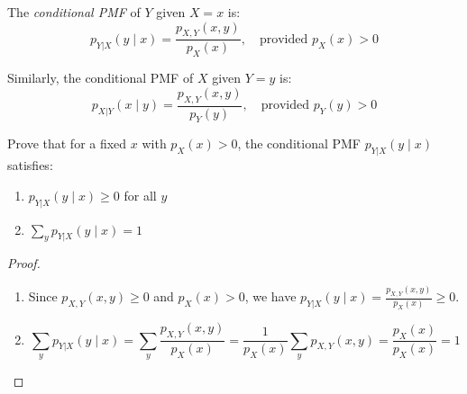 \begin{definition}
The \emph{conditional PMF} of $Y$ given $X = x$ is:
\[
p_{Y|X}(y \mid x) = \frac{p_{X,Y}(x, y)}{p_X(x)}, \quad \text{provided } p_X(x) > 0
\]

Similarly, the conditional PMF of $X$ given $Y = y$ is:
\[
p_{X|Y}(x \mid y) = \frac{p_{X,Y}(x, y)}{p_Y(y)}, \quad \text{provided } p_Y(y) > 0
\]
\end{definition}

\begin{exercise}
Prove that for a fixed $x$ with $p_X(x) > 0$, the conditional PMF $p_{Y|X}(y \mid x)$ satisfies:
\begin{enumerate}[label=(\alph*)]
    \item $p_{Y|X}(y \mid x) \geq 0$ for all $y$
    \item $\sum_{y} p_{Y|X}(y \mid x) = 1$
\end{enumerate}
\end{exercise}

\begin{proof}
\begin{enumerate}[label=(\alph*)]
    \item Since $p_{X,Y}(x, y) \geq 0$ and $p_X(x) > 0$, we have $p_{Y|X}(y \mid x) = \frac{p_{X,Y}(x, y)}{p_X(x)} \geq 0$.
    
    \item 
    \[
    \sum_{y} p_{Y|X}(y \mid x) = \sum_{y} \frac{p_{X,Y}(x, y)}{p_X(x)} = \frac{1}{p_X(x)} \sum_{y} p_{X,Y}(x, y) = \frac{p_X(x)}{p_X(x)} = 1
    \]
\end{enumerate}
\end{proof}

